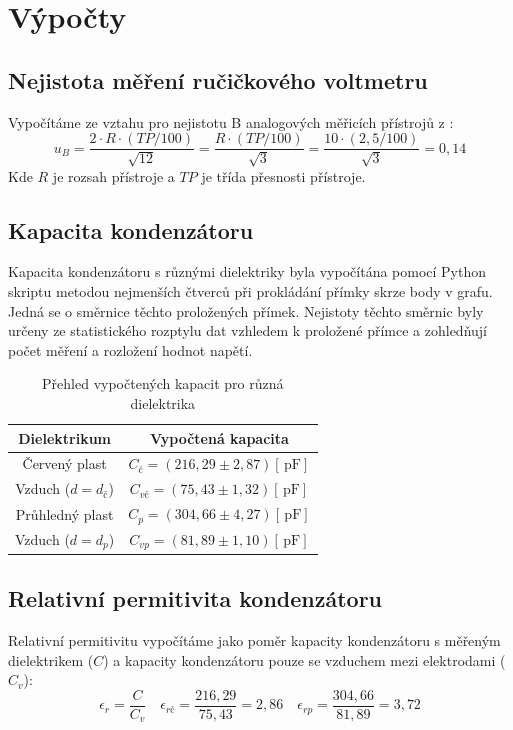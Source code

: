 \documentclass[a4paper,12pt]{article}
\newcommand{\unit}[1]{\ensuremath{\, \mathrm{#1}}}
\begin{document}
\section{Výpočty}
\subsection{Nejistota měření ručičkového voltmetru}
Vypočítáme ze vztahu pro nejistotu B analogových měřicích přístrojů z \cite{zpracdat}:
$$
u_B = \frac{2 \cdot R\cdot (TP/100)}{\sqrt{12}} = \frac{R\cdot (TP/100)}{\sqrt{3}} = \frac{10\cdot (2,5/100)}{\sqrt{3}} = 0,14
$$
Kde $R$ je rozsah přístroje a $TP$ je třída přesnosti přístroje.
\subsection{Kapacita kondenzátoru}
Kapacita kondenzátoru s různými dielektriky byla vypočítána pomocí Python skriptu metodou nejmenších čtverců při prokládání přímky skrze body v grafu. Jedná se o směrnice těchto proložených přímek. Nejistoty těchto směrnic byly určeny ze statistického rozptylu dat vzhledem k proložené přímce a zohledňují počet měření a rozložení hodnot napětí.

\begin{table}[H]
    \centering
    \renewcommand{\arraystretch}{1.5}
    \begin{tabular}{|c|c|}
        \hline
        \textbf{Dielektrikum} & \textbf{Vypočtená kapacita} \\ \hline
        Červený plast & $C_{č} = (216,29 \pm 2,87)[\unit{ pF}]$ \\ \hline
        Vzduch ($d = d_{č}$) & $C_{vč} = (75,43 \pm 1,32)[\unit{ pF}]$ \\ \hline
        Průhledný plast & $C_{p} = (304,66 \pm 4,27)[\unit{ pF}]$ \\ \hline
        Vzduch ($d = d_p$) & $C_{vp} = (81,89 \pm 1,10)[\unit{ pF}]$ \\  \hline
    \end{tabular}
    \caption{Přehled vypočtených kapacit pro různá dielektrika}
    \label{tab:out}
\end{table}

\subsection{Relativní permitivita kondenzátoru}
Relativní permitivitu vypočítáme jako poměr kapacity kondenzátoru s měřeným dielektrikem ($C$) a kapacity kondenzátoru pouze se vzduchem mezi elektrodami ($C_v$):
$$
\epsilon_r = \frac{C}{C_v} \quad \epsilon_{rč} = \frac{216,29}{75,43} = 2,86 \quad \epsilon_{rp} = \frac{304,66}{81,89} = 3,72
$$
\newpage
\end{document}
